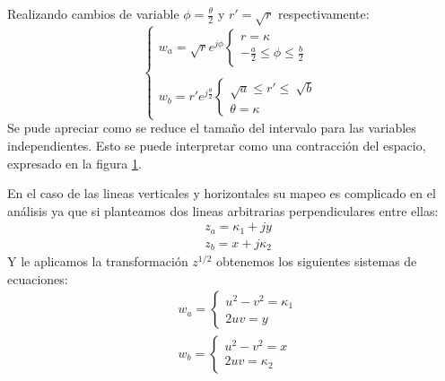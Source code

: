 Realizando cambios de variable $\phi=\frac{\theta}{2}$ y $r'=\sqrt{r}$ respectivamente:
\begin{equation}
\begin{cases}
    w_a=\sqrt{r}e^{j\phi}\begin{cases}
            r=\kappa\\
            -\frac{a}{2}\leq\phi\leq \frac{b}{2}
        \end{cases}\\
    \\
    w_b=r'e^{j\frac{\theta}{2}}\begin{cases}
        \sqrt{a}\leq r'\leq\ \sqrt{b}\\
        \theta=\kappa
        \end{cases}
\end{cases}
\end{equation}
Se pude apreciar como se reduce el tamaño del intervalo para las variables independientes. Esto se puede interpretar como una contracción del espacio, expresado en la figura \ref{fig:z^0.5F1}.
\begin{figure}[H]
    \centering
    \begin{minipage}{0.49\textwidth}
    \centering
        
    \end{minipage}
    \begin{minipage}{0.49\textwidth}
    \centering
        
    \end{minipage}
    \caption{}
    \label{fig:z^0.5F1}
\end{figure}
En el caso de las lineas verticales y horizontales su mapeo es complicado en el análisis ya que si planteamos dos lineas arbitrarias perpendiculares entre ellas:
\begin{equation}
    \begin{aligned}
    &z_a=\kappa_1+jy\\
    &z_b=x+j\kappa_2
    \end{aligned}
\end{equation}
Y le aplicamos la transformación $z^{1/2}$ obtenemos los siguientes sistemas de ecuaciones:
\begin{equation}
    \begin{aligned}
    &w_a=\begin{cases}u^2-v^2=\kappa_1\\2uv=y\end{cases}\\
    &w_b=\begin{cases}u^2-v^2=x\\2uv=\kappa_2\end{cases}
    \end{aligned}
\end{equation}
